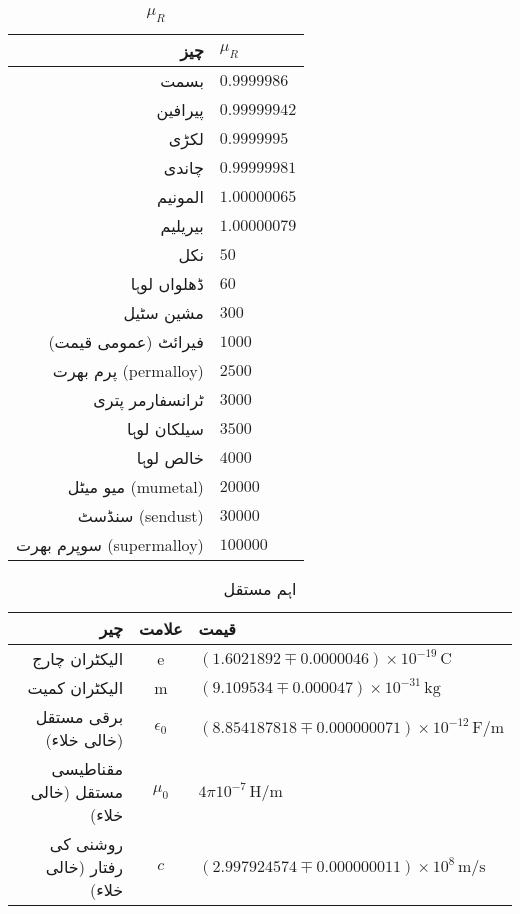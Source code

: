 {\renewcommand{\arraystretch}{1.2}
\begin{table}
\caption{$\mu_R$}
\centering
\begin{tabular}{r | l}
\hline
چیز & $\mu_R$ \\
\hline
بسمت & $\num{0.9999986}$\\
پیرافین & $\num{0.99999942}$\\
لکڑی & $\num{0.9999995}$\\
چاندی & $\num{0.99999981}$\\
المونیم & $\num{1.00000065}$\\
بیریلیم & $\num{1.00000079}$\\
نکل & $\num{50}$\\
ڈھلواں لوہا & $\num{60}$\\
مشین سٹیل & $\num{300}$\\
فیرائٹ (عمومی قیمت) & $\num{1000}$\\
پرم بھرت (permalloy) & $\num{2500}$\\
ٹرانسفارمر پتری & $\num{3000}$\\
سیلکان لوہا & $\num{3500}$\\
خالص لوہا & $\num{4000}$\\
میو میٹل (mumetal) & $\num{20000}$\\
سنڈسٹ (sendust) & $\num{30000}$\\
سوپرم بھرت (supermalloy) & $\num{100000}$\\
\end{tabular}
\label{جدول_جدول_جزوی_مقناطیسی_مستقل}
\end{table}
}
{\renewcommand{\arraystretch}{1.2}
\begin{table}
\caption{اہم مستقل}
\centering
\begin{tabular}{r |c | l}
\hline
چیر & علامت & قیمت\\
\hline
الیکٹران چارج & e & $(\num{1.6021892} \mp \num{0.0000046})\times 10^{-19} \, \si{\coulomb}$\\
الیکٹران کمیت & m & $(\num{9.109534} \mp  \num{0.000047}) \times 10^{-31} \, \si{\kilogram}$\\
برقی مستقل (خالی خلاء) & $\epsilon_0$ & $(\num{8.854187818} \mp \num{0.000000071} ) \times 10^{-12} \, \si{\farad \per \meter}$\\
مقناطیسی مستقل (خالی خلاء) & $\mu_0$  &   $4 \pi 10^{-7} \, \si{\henry \per \meter}$\\
روشنی کی رفتار (خالی خلاء) & $c$ & $(\num{2.997924574} \mp \num{0.000000011}) \times 10^{8} \, \si{\meter \per \second}$\\
\end{tabular}
\label{جدول-جدول_اہم_مستقل}
\end{table}
}
